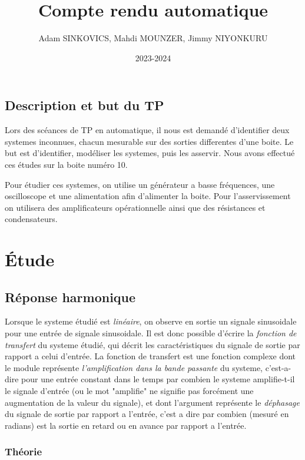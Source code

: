 \documentclass[12pt, a4paper]{report}
\title{Compte rendu automatique}
\author{Adam SINKOVICS, Mahdi MOUNZER, Jimmy NIYONKURU}
\date{2023-2024}
\begin{document}
\maketitle
\pagebreak

\section*{Description et but du TP}

Lors des scéances de TP en automatique, il nous est demandé d'identifier
deux systemes inconnues, chacun mesurable sur des sorties differentes
d'une boite.
Le but est d'identifier, modéliser les systemes, puis les asservir. Nous avons
effectué ces études sur la boite numéro 10.\par
Pour étudier ces systemes, on utilise un générateur a basse fréquences,
une oscilloscope et une alimentation afin d'alimenter la boite. Pour l'asservissement on utilisera des amplificateurs opérationnelle ainsi que
des résistances et condensateurs.
\nopagebreak

\chapter{Étude}

\section{Réponse harmonique}

Lorsque le systeme étudié est \textit{linéaire}, on observe en sortie un signale sinusoidale 
pour une entrée de signale sinusoidale. Il est donc possible d'écrire la \textit{fonction de transfert}
du systeme étudié, qui décrit les caractéristiques du signale de sortie par rapport
a celui d'entrée. La fonction de transfert est une fonction complexe dont le module
représente \textit{l'amplification dans la bande passante} du systeme, c'est-a-dire pour une entrée constant dans le temps
par combien le systeme amplifie-t-il le signale d'entrée (ou le mot "amplifie" ne signifie pas
forcément une augmentation de la valeur du signale), et dont l'argument représente le \textit{déphasage} du signale
de sortie par rapport a l'entrée, c'est a dire par combien (mesuré en radians) est la sortie en retard
ou en avance par rapport a l'entrée.

\subsection{Théorie}
\end{document}

